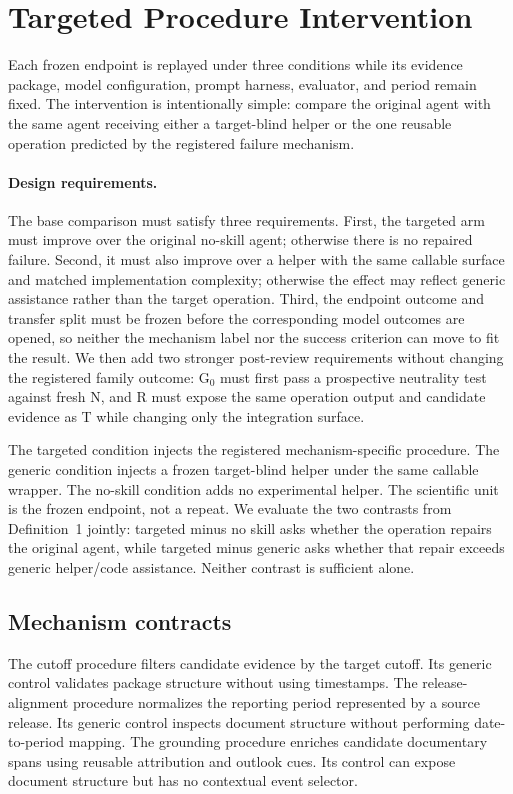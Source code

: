 \section{Targeted Procedure Intervention}
\label{sec:intervention}
Each frozen endpoint is replayed under three conditions while its evidence package, model configuration, prompt harness, evaluator, and period remain fixed. The intervention is intentionally simple: compare the original agent with the same agent receiving either a target-blind helper or the one reusable operation predicted by the registered failure mechanism.

\paragraph{Design requirements.}
The base comparison must satisfy three requirements. First, the targeted arm must improve over the original no-skill agent; otherwise there is no repaired failure. Second, it must also improve over a helper with the same callable surface and matched implementation complexity; otherwise the effect may reflect generic assistance rather than the target operation. Third, the endpoint outcome and transfer split must be frozen before the corresponding model outcomes are opened, so neither the mechanism label nor the success criterion can move to fit the result. We then add two stronger post-review requirements without changing the registered family outcome: G$_0$ must first pass a prospective neutrality test against fresh N, and R must expose the same operation output and candidate evidence as T while changing only the integration surface.

The targeted condition injects the registered mechanism-specific procedure. The generic condition injects a frozen target-blind helper under the same callable wrapper. The no-skill condition adds no experimental helper. The scientific unit is the frozen endpoint, not a repeat. We evaluate the two contrasts from Definition~1 jointly: targeted minus no skill asks whether the operation repairs the original agent, while targeted minus generic asks whether that repair exceeds generic helper/code assistance. Neither contrast is sufficient alone.

\subsection{Mechanism contracts}
The cutoff procedure filters candidate evidence by the target cutoff. Its generic control validates package structure without using timestamps. The release-alignment procedure normalizes the reporting period represented by a source release. Its generic control inspects document structure without performing date-to-period mapping. The grounding procedure enriches candidate documentary spans using reusable attribution and outlook cues. Its control can expose document structure but has no contextual event selector.

